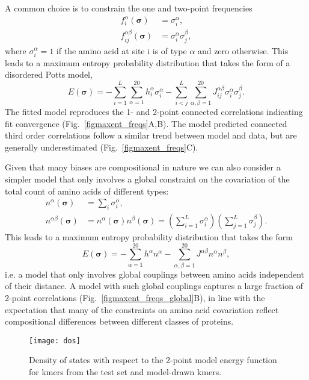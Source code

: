 \documentclass[superscriptaddress,twocolumn,pre]{revtex4}
\newcommand{\B}{\boldsymbol}
\newcommand{\<}{\langle}
\renewcommand{\>}{\rangle}
\begin{document}
A common choice is to constrain the one and two-point frequencies
\begin{align}
    f_i^\alpha(\B \sigma) &= \sigma_i^\alpha, \\
    f_{ij}^{\alpha\beta}(\B \sigma) &= \sigma_i^\alpha \sigma_j^\beta,
\end{align}
where $\sigma_i^\alpha = 1$ if the amino acid at site i is of type $\alpha$ and zero otherwise.
This leads to a maximum entropy probability distribution that takes the form of a disordered Potts model,
\begin{equation}
    E(\boldsymbol \sigma) = - \sum_{i=1}^L \sum_{\alpha = 1}^{20} h_i^\alpha \sigma_i^\alpha - \sum_{i<j}^L \sum_{\alpha,\beta = 1}^{20} J_{ij}^{\alpha \beta}  \sigma_i^\alpha \sigma_j^\beta.
\end{equation}
The fitted model reproduces the 1- and 2-point connected correlations indicating fit convergence (Fig.~\ref{figmaxent_freqs}A,B). The model predicted connected third order correlations follow a similar trend between model and data, but are generally underestimated (Fig.~\ref{figmaxent_freqs}C).

Given that many biases are compositional in nature we can also consider a simpler model that only involves a global constraint on the covariation of the total count of amino acids of different types:
\begin{align}
    n^\alpha(\B \sigma) &= \sum_i \sigma_i^\alpha, \\
    n^{\alpha\beta}(\B \sigma) &= n^\alpha(\B \sigma) n^\beta(\B\sigma) = \left(\sum_{i=1}^L \sigma_i^\alpha\right) \left(\sum_{j=1}^L \sigma_j^\beta\right).
\end{align}
This leads to a maximum entropy probability distribution that takes the form
\begin{equation}
    E(\boldsymbol \sigma) = - \sum_{\alpha=1}^{20} h^\alpha n^\alpha -  \sum_{\alpha,\beta = 1}^{20} J^{\alpha \beta} n^\alpha n^\beta,
\end{equation}
i.e. a model that only involves global couplings between amino acids independent of their distance.
A model with such global couplings captures a large fraction of 2-point correlations (Fig.~\ref{figmaxent_freqs_global}B), in line with the expectation that many of the constraints on amino acid covariation reflect compositional differences between different classes of proteins.


\begin{figure}
    \texttt{[image: dos]}
    \caption{Density of states with respect to the 2-point model energy function for kmers from the test set and model-drawn kmers.
    \label{figdos}
    }
\end{figure}
\end{document}
